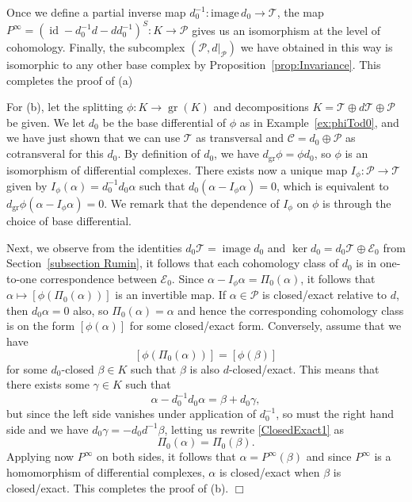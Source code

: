 \documentclass[10pt]{amsart}
\theoremstyle{remark}
\newcommand{\calP}{\mathcal{P}}
\newcommand{\calT}{\mathcal{T}}
\newcommand{\calC}{\mathcal{C}}
\newcommand{\calE}{\mathcal{E}}
\DeclareMathOperator{\id}{id}
\DeclareMathOperator{\image}{image}
\DeclareMathOperator{\gr}{gr}
\numberwithin{equation}{section}
\begin{document}
Once we define a partial inverse map $d_{0}^{-1}\colon\mathrm{image}\,d_{0}\to\mathcal{T}$, the map $P^\infty = (\id - d_{0}^{-1} d - d d_{0}^{-1})^S\colon K\to \mathcal{P}$ gives us an isomorphism at the level of cohomology. Finally, the subcomplex $(\mathcal{P},d\vert_{\mathcal{P}})$ we have obtained in this way is isomorphic to any other base complex by Proposition~\ref{prop:Invariance}. This completes the proof of (a)

For (b), let the splitting $\phi:K \to \gr(K)$ and decompositions $K = \calT \oplus d \calT \oplus \calP$ be given. We let $d_0$ be the base differential of $\phi$ as in Example~\ref{ex:phiTod0}, and we have just shown that we can use $\calT$ as transversal and $\calC = d_0 \oplus \calP$ as cotransveral for this $d_0$. By definition of $d_0$, we have $d_{\gr} \phi = \phi d_0$, so $\phi$ is an isomorphism of differential complexes. There exists now a unique map $I_\phi: \calP \to \calT$ given by $I_\phi(\alpha) = d_0^{-1} d_0 \alpha$ such that $d_0 (\alpha - I_\phi \alpha) =0$, which is equivalent to $d_{\gr}\phi(\alpha- I_\phi \alpha) = 0$. We remark that the dependence of $I_\phi$ on $\phi$ is through the choice of base differential.

Next, we observe from the identities $d_0 \calT = \image d_0$ and $\ker d_0 = d_0 \calT \oplus \calE_0$ from Section~\ref{subsection Rumin}, it follows that each cohomology class of $d_0$ is in one-to-one correspondence between $\calE_0$. Since $\alpha - I_\phi \alpha = \Pi_0(\alpha)$, it follows that $\alpha \mapsto [\phi(\Pi_0(\alpha))]$ is an invertible map. If $\alpha \in \calP$ is closed/exact relative to $d$, then $d_0 \alpha =0$ also, so $\Pi_0(\alpha) = \alpha$ and hence the corresponding cohomology class is on the form $[\phi(\alpha)]$ for some closed/exact form. Conversely, assume that we have
$$[\phi(\Pi_0(\alpha))] = [\phi(\beta)]$$
for some $d_0$-closed $\beta \in K$ such that $\beta$ is also $d$-closed/exact. This means that there exists some $\gamma \in K$ such that
\begin{equation} \label{ClosedExact1} \alpha - d_0^{-1} d_0 \alpha = \beta + d_0 \gamma,\end{equation}
but since the left side vanishes under application of $d_0^{-1}$, so must the right hand side and we have $d_0 \gamma =- d_0d^{-1} \beta$, letting us rewrite \eqref{ClosedExact1} as
$$\Pi_0(\alpha) = \Pi_0(\beta).$$
Applying now $P^\infty$ on both sides, it follows that $\alpha = P^\infty(\beta)$ and since $P^\infty$ is a homomorphism of differential complexes, $\alpha$ is closed/exact when $\beta$ is closed/exact. This completes the proof of (b). $\Box$
\end{document}

